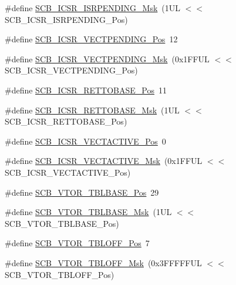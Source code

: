 \begin{DoxyCompactItemize}
\item 
\#define \hyperlink{group___c_m_s_i_s___s_c_b_ga056d74fd538e5d36d3be1f28d399c877}{\-S\-C\-B\-\_\-\-I\-C\-S\-R\-\_\-\-I\-S\-R\-P\-E\-N\-D\-I\-N\-G\-\_\-\-Msk}~(1\-U\-L $<$$<$ S\-C\-B\-\_\-\-I\-C\-S\-R\-\_\-\-I\-S\-R\-P\-E\-N\-D\-I\-N\-G\-\_\-\-Pos)
\item 
\#define \hyperlink{group___c_m_s_i_s___s_c_b_gada60c92bf88d6fd21a8f49efa4a127b8}{\-S\-C\-B\-\_\-\-I\-C\-S\-R\-\_\-\-V\-E\-C\-T\-P\-E\-N\-D\-I\-N\-G\-\_\-\-Pos}~12
\item 
\#define \hyperlink{group___c_m_s_i_s___s_c_b_gacb6992e7c7ddc27a370f62878a21ef72}{\-S\-C\-B\-\_\-\-I\-C\-S\-R\-\_\-\-V\-E\-C\-T\-P\-E\-N\-D\-I\-N\-G\-\_\-\-Msk}~(0x1\-F\-F\-U\-L $<$$<$ S\-C\-B\-\_\-\-I\-C\-S\-R\-\_\-\-V\-E\-C\-T\-P\-E\-N\-D\-I\-N\-G\-\_\-\-Pos)
\item 
\#define \hyperlink{group___c_m_s_i_s___s_c_b_ga403d154200242629e6d2764bfc12a7ec}{\-S\-C\-B\-\_\-\-I\-C\-S\-R\-\_\-\-R\-E\-T\-T\-O\-B\-A\-S\-E\-\_\-\-Pos}~11
\item 
\#define \hyperlink{group___c_m_s_i_s___s_c_b_gaca6fc3f79bb550f64fd7df782ed4a5f6}{\-S\-C\-B\-\_\-\-I\-C\-S\-R\-\_\-\-R\-E\-T\-T\-O\-B\-A\-S\-E\-\_\-\-Msk}~(1\-U\-L $<$$<$ S\-C\-B\-\_\-\-I\-C\-S\-R\-\_\-\-R\-E\-T\-T\-O\-B\-A\-S\-E\-\_\-\-Pos)
\item 
\#define \hyperlink{group___c_m_s_i_s___s_c_b_gae4f602c7c5c895d5fb687b71b0979fc3}{\-S\-C\-B\-\_\-\-I\-C\-S\-R\-\_\-\-V\-E\-C\-T\-A\-C\-T\-I\-V\-E\-\_\-\-Pos}~0
\item 
\#define \hyperlink{group___c_m_s_i_s___s_c_b_ga5533791a4ecf1b9301c883047b3e8396}{\-S\-C\-B\-\_\-\-I\-C\-S\-R\-\_\-\-V\-E\-C\-T\-A\-C\-T\-I\-V\-E\-\_\-\-Msk}~(0x1\-F\-F\-U\-L $<$$<$ S\-C\-B\-\_\-\-I\-C\-S\-R\-\_\-\-V\-E\-C\-T\-A\-C\-T\-I\-V\-E\-\_\-\-Pos)
\item 
\#define \hyperlink{group___c_m_s_i_s___s_c_b_gad9720a44320c053883d03b883b955751}{\-S\-C\-B\-\_\-\-V\-T\-O\-R\-\_\-\-T\-B\-L\-B\-A\-S\-E\-\_\-\-Pos}~29
\item 
\#define \hyperlink{group___c_m_s_i_s___s_c_b_ga778dd0ba178466b2a8877a6b8aa345ee}{\-S\-C\-B\-\_\-\-V\-T\-O\-R\-\_\-\-T\-B\-L\-B\-A\-S\-E\-\_\-\-Msk}~(1\-U\-L $<$$<$ S\-C\-B\-\_\-\-V\-T\-O\-R\-\_\-\-T\-B\-L\-B\-A\-S\-E\-\_\-\-Pos)
\item 
\#define \hyperlink{group___c_m_s_i_s___s_c_b_gac6a55451ddd38bffcff5a211d29cea78}{\-S\-C\-B\-\_\-\-V\-T\-O\-R\-\_\-\-T\-B\-L\-O\-F\-F\-\_\-\-Pos}~7
\item 
\#define \hyperlink{group___c_m_s_i_s___s_c_b_ga75e395ed74042923e8c93edf50f0996c}{\-S\-C\-B\-\_\-\-V\-T\-O\-R\-\_\-\-T\-B\-L\-O\-F\-F\-\_\-\-Msk}~(0x3\-F\-F\-F\-F\-F\-U\-L $<$$<$ S\-C\-B\-\_\-\-V\-T\-O\-R\-\_\-\-T\-B\-L\-O\-F\-F\-\_\-\-Pos)

\end{DoxyCompactItemize}
